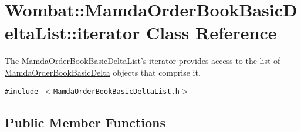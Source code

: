 \hypertarget{classWombat_1_1MamdaOrderBookBasicDeltaList_1_1iterator}{
\section{Wombat::Mamda\-Order\-Book\-Basic\-Delta\-List::iterator Class Reference}
\label{classWombat_1_1MamdaOrderBookBasicDeltaList_1_1iterator}
}
The Mamda\-Order\-Book\-Basic\-Delta\-List's iterator provides access to the list of \hyperlink{classWombat_1_1MamdaOrderBookBasicDelta}{Mamda\-Order\-Book\-Basic\-Delta} objects that comprise it.  


{\tt \#include $<$Mamda\-Order\-Book\-Basic\-Delta\-List.h$>$}

\subsection*{Public Member Functions}
